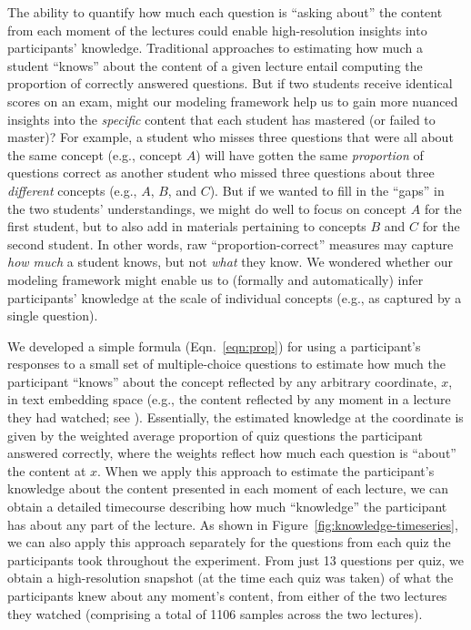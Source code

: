 \documentclass[10pt]{article}
\renewcommand{\nameref}[1]{\mbox{\textit{\oldnameref{#1}}}}
\begin{document}
The ability to quantify how much each question is ``asking about'' the content
from each moment of the lectures could enable high-resolution insights into
participants' knowledge. Traditional approaches to estimating how much a
student ``knows'' about the content of a given lecture entail computing the
proportion of correctly answered questions. But if two students receive
identical scores on an exam, might our modeling framework help us to gain more
nuanced insights into the \textit{specific} content that each student has
mastered (or failed to master)? For example, a student who misses three
questions that were all about the same concept (e.g., concept $A$) will have
gotten the same \textit{proportion} of questions correct as another student who
missed three questions about three \textit{different} concepts (e.g., $A$, $B$,
and $C$). But if we wanted to fill in the ``gaps'' in the two students'
understandings, we might do well to focus on concept $A$ for the first student,
but to also add in materials pertaining to concepts $B$ and $C$ for the second
student. In other words, raw ``proportion-correct'' measures may capture
\textit{how much} a student knows, but not \textit{what} they know. We wondered
whether our modeling framework might enable us to (formally and automatically)
infer participants' knowledge at the scale of individual concepts (e.g., as
captured by a single question).

We developed a simple formula (Eqn.~\ref{eqn:prop}) for using a participant's
responses to a small set of multiple-choice questions to estimate how much the
participant ``knows'' about the concept reflected by any arbitrary coordinate,
$x$, in text embedding space (e.g., the content reflected by any moment in a
lecture they had watched; see \nameref{subsec:traces}). Essentially, the
estimated knowledge at the coordinate is given by the weighted average
proportion of quiz questions the participant answered correctly, where the
weights reflect how much each question is ``about'' the content at $x$. When we
apply this approach to estimate the participant's knowledge about the content
presented in each moment of each lecture, we can obtain a detailed timecourse
describing how much ``knowledge'' the participant has about any part of the
lecture. As shown in Figure~\ref{fig:knowledge-timeseries}, we can also apply
this approach separately for the questions from each quiz the participants took
throughout the experiment. From just 13 questions per quiz, we obtain a
high-resolution snapshot (at the time each quiz was taken) of what the
participants knew about any moment's content, from either of the two lectures
they watched (comprising a total of 1106 samples across the two lectures).
\end{document}
